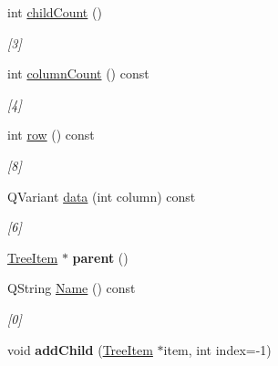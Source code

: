 \begin{DoxyCompactItemize}
int \hyperlink{class_tree_item_aab845511f8626b68b59fe8681eab8e8c}{child\+Count} ()
\begin{DoxyCompactList}\small\item\em \mbox{[}3\mbox{]} \end{DoxyCompactList}\item 
int \hyperlink{class_tree_item_a3314c3678d8ea4dee2f736c32f7b28b9}{column\+Count} () const
\begin{DoxyCompactList}\small\item\em \mbox{[}4\mbox{]} \end{DoxyCompactList}\item 
\mbox{\label{class_tree_item_a91ba04ea12214af828bb198c2b98fa66}} 
int \hyperlink{class_tree_item_a91ba04ea12214af828bb198c2b98fa66}{row} () const
\begin{DoxyCompactList}\small\item\em \mbox{[}8\mbox{]} \end{DoxyCompactList}\item 
\mbox{\label{class_tree_item_ae1decf8f5fb22c781ada09f397201a2b}} 
Q\+Variant \hyperlink{class_tree_item_ae1decf8f5fb22c781ada09f397201a2b}{data} (int column) const
\begin{DoxyCompactList}\small\item\em \mbox{[}6\mbox{]} \end{DoxyCompactList}\item 
\mbox{\label{class_tree_item_a392ec493dfab91ee474d7ff83e2c0211}} 
\hyperlink{class_tree_item}{Tree\+Item} $\ast$ {\bfseries parent} ()
\item 
\mbox{\label{class_tree_item_a5de424c519cad3821aa35a71134bce55}} 
Q\+String \hyperlink{class_tree_item_a5de424c519cad3821aa35a71134bce55}{Name} () const
\begin{DoxyCompactList}\small\item\em \mbox{[}0\mbox{]} \end{DoxyCompactList}\item 
\mbox{\label{class_tree_item_a8db0cc20a6505d927115004d819864e3}} 
void {\bfseries add\+Child} (\hyperlink{class_tree_item}{Tree\+Item} $\ast$item, int index=-\/1)
\item 
\mbox{\label{class_tree_item_aa14592005278a874f2f958d5396bba2e}} 

\end{DoxyCompactItemize}
